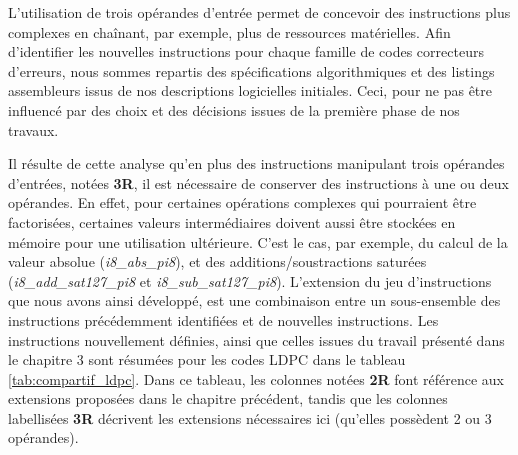 \documentclass[../main.tex]{subfiles}
\begin{document}
L'utilisation de trois opérandes d'entrée permet de concevoir des instructions plus complexes en chaînant, par exemple, plus de ressources matérielles. 
Afin d'identifier les nouvelles instructions pour chaque famille de codes correcteurs d'erreurs, nous sommes repartis des spécifications algorithmiques et des listings assembleurs issus de nos descriptions logicielles initiales. 
Ceci, pour ne pas être influencé par des choix et des décisions issues de la première phase de nos travaux.

Il résulte de cette analyse qu'en plus des instructions manipulant trois opérandes d'entrées, notées \textbf{3R}, il est nécessaire de conserver des instructions à une ou deux opérandes.
En effet, pour certaines opérations complexes qui pourraient être factorisées, certaines valeurs intermédiaires doivent aussi être stockées en mémoire pour une utilisation ultérieure. 
C'est le cas, par exemple, du calcul de la valeur absolue (\textit{i8\_abs\_pi8}), et des additions/soustractions saturées (\textit{i8\_add\_sat127\_pi8} et \textit{i8\_sub\_sat127\_pi8}). 
L'extension du jeu d'instructions que nous avons ainsi développé, est une combinaison entre un sous-ensemble des instructions précédemment identifiées et de nouvelles instructions. 
Les instructions nouvellement définies, ainsi que celles issues du travail présenté dans le chapitre 3 sont résumées pour les codes LDPC dans le tableau \ref{tab:compartif_ldpc}. 
Dans ce tableau, les colonnes notées \textbf{2R} font référence aux extensions proposées dans le chapitre précédent, tandis que les colonnes labellisées \textbf{3R} décrivent les extensions nécessaires ici (qu'elles possèdent 2 ou 3 opérandes).
\end{document}
